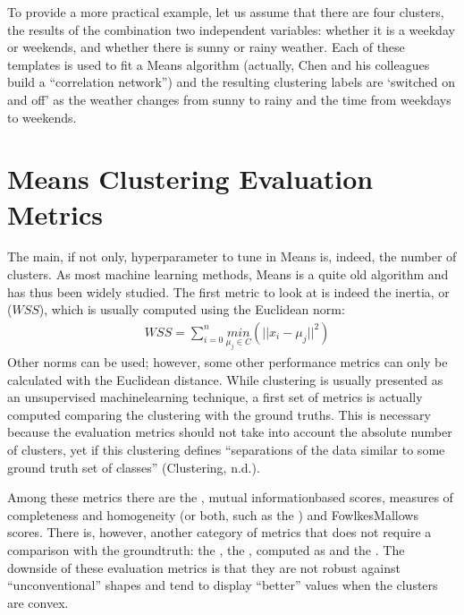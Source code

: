 \documentclass[letterpaper,10pt,english]{jupyterBook}
\begin{document}
\sphinxAtStartPar
To provide a more practical example, let us assume that there are four clusters, the results of the combination two independent variables: whether it is a weekday or weekends, and whether there is sunny or rainy weather. Each of these templates is used to fit a \sphinxhyphen{}Means algorithm (actually, Chen and his colleagues build a “correlation network”) and the resulting clustering labels are ‘switched on and off’ as the weather changes from sunny to rainy and the time from weekdays to weekends.


\section{\sphinxhyphen{}Means Clustering Evaluation Metrics}
\label{\detokenize{04-stations_kmeans:k-means-clustering-evaluation-metrics}}
\sphinxAtStartPar
The main, if not only, hyperparameter to tune in \sphinxhyphen{}Means is, indeed, the number of clusters.
As most machine learning methods, \sphinxhyphen{}Means is a quite old algorithm and has thus been widely studied.
The first metric to look at is indeed the inertia, or  (\(WSS\)), which is usually computed using the Euclidean norm:
\label{equation:04-stations_kmeans:81745750-4070-4360-921e-34254ffe5636}\begin{align}
& WSS = \sum_{i=0}^{n}\underset{\mu_{j}\in{C}}{min}(||x_{i} - \mu_{j}||^2)
\end{align}
\sphinxAtStartPar
Other norms can be used; however, some other performance metrics can only be calculated with the Euclidean distance. While clustering is usually presented as an unsupervised machine\sphinxhyphen{}learning technique, a first set of metrics is actually computed comparing the clustering with the ground truths. This is necessary because the evaluation metrics should not take into account the absolute number of clusters, yet if this clustering defines “separations of the data similar to some ground truth set of classes” (Clustering, n.d.).

\sphinxAtStartPar
Among these metrics there are the , mutual information\sphinxhyphen{}based scores, measures of completeness and homogeneity (or both, such as the ) and Fowlkes\sphinxhyphen{}Mallows scores. There is, however, another category of metrics that does not require a comparison with the ground\sphinxhyphen{}truth: the , the , computed as  and  the . The downside of these evaluation metrics is that they are not robust against “unconventional” shapes and tend to display “better” values when the clusters are convex.
\end{document}
